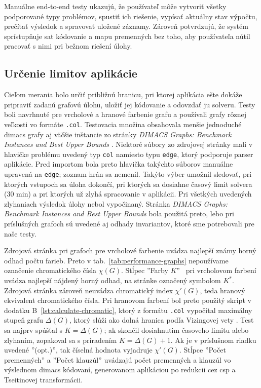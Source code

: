 Manuálne end-to-end testy ukazujú, že používateľ môže vytvoriť všetky podporované typy problémov, spustiť ich riešenie, vypísať aktuálny stav výpočtu, prečítať výsledok a spravovať uložené záznamy. Zároveň potvrdzujú, že systém sprístupňuje \acrshort{sat} kódovanie a mapu premenných bez toho, aby používateľa nútil pracovať s nimi pri bežnom riešení úlohy.

\subsection{Určenie limitov aplikácie}\label{sec:testing:performance}
Cieľom merania bolo určiť približnú hranicu, pri ktorej aplikácia ešte dokáže pripraviť zadanú grafovú úlohu, uložiť jej kódovanie a odovzdať ju solveru. Testy boli navrhnuté pre vrcholové a hranové farbenie grafu a používali grafy rôznej veľkosti vo formáte \texttt{.col}. Testovacia množina obsahovala menšie jednoduché \acrshort{dimacs} grafy aj väčšie inštancie zo stránky \textit{DIMACS Graphs: Benchmark Instances and Best Upper Bounds} \cite{porumbel-dimacs-graphs}.  Niektoré súbory zo zdrojovej stránky mali v hlavičke problému uvedený typ \texttt{col} namiesto typu \texttt{edge}, ktorý podporuje parser aplikácie. Pred importom bola preto hlavička takýchto súborov manuálne upravená na \texttt{edge}; zoznam hrán sa nemenil. Takýto výber umožnil sledovať, pri ktorých vstupoch sa úloha dokončí, pri ktorých sa dosiahne časový limit solvera (30 min) a pri ktorých už zlyhá spracovanie v aplikácii. Pri všetkých uvedených zlyhaniach výsledok úlohy nebol vypočinaný. Stránka \textit{DIMACS Graphs: Benchmark Instances and Best Upper Bounds} bola použitá preto, lebo pri príslušných grafoch sú uvedené aj odhady invariantov, ktoré sme potrebovali pre naše testy.

Zdrojová stránka pri grafoch pre vrcholové farbenie uvádza najlepší známy horný odhad počtu farieb. Preto v tab.~\ref{tab:performance-graphs} nepoužívame označenie chromatického čísla $\chi(G)$. Stĺpec ''Farby $K$'' ~pri vrcholovom farbení uvádza najlepší nájdený horný odhad, na stránke označený symbolom $K^{*}$. Zdrojová stránka zároveň neuvádza chromatický index $\chi'(G)$, teda hranový ekvivalent chromatického čísla. Pri hranovom farbení bol preto použitý skript v dodatku B~\ref{lst:calculate-chromatic}, ktorý z formátu \texttt{.col} vypočítal maximálny stupeň grafu $\Delta(G)$, ktorý slúži ako dolná hranica podľa Vizingovej vety \cite{weisstein-edge-chromatic-number}. Test sa najprv spúšťal s $K=\Delta(G)$; ak skončil dosiahnutim časoveho limitu alebo zlyhaním, zopakoval sa s priradením $K=\Delta(G)+1$. Ak je v príslušnom riadku uvedené ''(opt.)'', tak číselná hodnota vyjadruje $\chi'(G)$. Stĺpce ''Počet premenných'' a ''Počet klauzúl'' uvádzajú počet premenných a klauzúl vo výslednom \acrshort{dimacs} kódovaní, generovanom aplikáciou po redukcii cez \acrshort{csp} a Tseitinovej transformácii.

